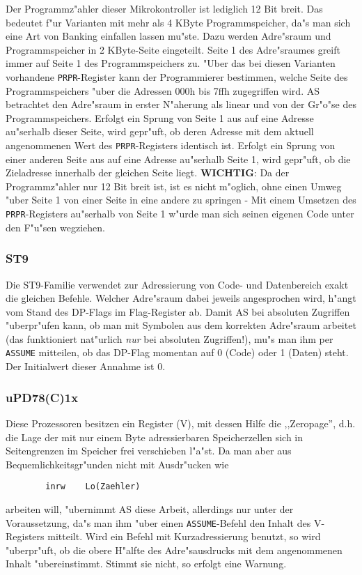 \documentclass[12pt,a4paper,twoside]{report}
\newcommand{\tty}[1]{{\tt #1}}
\begin{document}
Der Programmz"ahler dieser Mikrokontroller ist lediglich 12 Bit breit.  Das
bedeutet f"ur Varianten mit mehr als 4 KByte Programmspeicher, da"s man sich
eine Art von Banking einfallen lassen mu"ste.  Dazu werden Adre"sraum und
Programmspeicher in 2 KByte-Seite eingeteilt.  Seite 1 des Adre"sraumes
greift immer auf Seite 1 des Programmspeichers zu.  "Uber das bei diesen
Varianten vorhandene \tty{PRPR}-Register kann der Programmierer bestimmen,
welche Seite des Programmspeichers "uber die Adressen 000h bis 7ffh
zugegriffen wird.  AS betrachtet den Adre"sraum in erster N"aherung als
linear und von der Gr"o"se des Programmspeichers.  Erfolgt ein Sprung von
Seite 1 aus auf eine Adresse au"serhalb dieser Seite, wird gepr"uft, ob deren
Adresse mit dem aktuell angenommenen Wert des \tty{PRPR}-Registers identisch
ist.  Erfolgt ein Sprung von einer anderen Seite aus auf eine Adresse au"serhalb
Seite 1, wird gepr"uft, ob die Zieladresse innerhalb der gleichen Seite
liegt.  {\bf WICHTIG}: Da der Programmz"ahler nur 12 Bit breit ist, ist
es nicht m"oglich, ohne einen Umweg "uber Seite 1 von einer Seite in eine
andere zu springen - Mit einem Umsetzen des \tty{PRPR}-Registers au"serhalb
von Seite 1 w"urde man sich seinen eigenen Code unter den F"u"sen wegziehen.


\subsubsection{ST9}

Die ST9-Familie verwendet zur Adressierung von Code- und Datenbereich
exakt die gleichen Befehle.  Welcher Adre"sraum dabei jeweils
angesprochen wird, h"angt vom Stand des DP-Flags im Flag-Register ab.
Damit AS bei absoluten Zugriffen "uberpr"ufen kann, ob man mit Symbolen
aus dem korrekten Adre"sraum arbeitet (das funktioniert nat"urlich {\em nur}
bei absoluten Zugriffen!), mu"s man ihm per \tty{ASSUME} mitteilen, ob das
DP-Flag momentan auf 0 (Code) oder 1 (Daten) steht.  Der Initialwert
dieser Annahme ist 0.


\subsubsection{uPD78(C)1x}

Diese Prozessoren besitzen ein Register (V), mit dessen Hilfe die
,,Zeropage'', d.h. die Lage der mit nur einem Byte adressierbaren
Speicherzellen sich in Seitengrenzen im Speicher frei verschieben l"a"st.
Da man aber aus Bequemlichkeitsgr"unden nicht mit Ausdr"ucken wie
\begin{verbatim}
        inrw    Lo(Zaehler)
\end{verbatim}
arbeiten will, "ubernimmt AS diese Arbeit, allerdings nur unter der
Voraussetzung, da"s man ihm "uber einen \tty{ASSUME}-Befehl den
Inhalt des V-Registers mitteilt.  Wird ein Befehl mit Kurzadressierung
benutzt, so wird "uberpr"uft, ob die obere H"alfte des Adre"sausdrucks
mit dem angenommenen Inhalt "ubereinstimmt.  Stimmt sie nicht, so erfolgt
eine Warnung.
\end{document}
